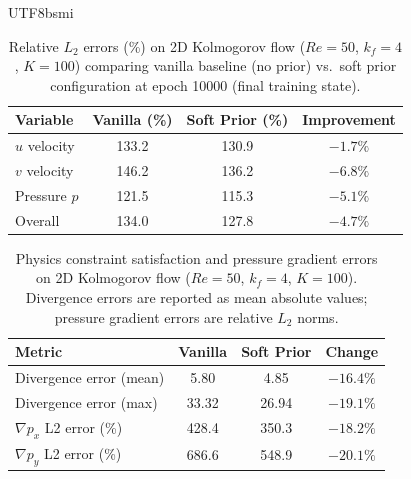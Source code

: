 \documentclass[master]{NTHUthesis}
\begin{document}
\begin{CJK*}{UTF8}{bsmi}
\begin{table}[htbp]
    \centering
    \caption{Relative $L_2$ errors (\%) on 2D Kolmogorov flow ($Re=50$, $k_f=4$, $K=100$) comparing vanilla baseline (no prior) vs.\ soft prior configuration at epoch 10000 (final training state).}
    \label{tab:kolmogorov_l2}
    \begin{tabular}{lccc}
    \toprule
    \textbf{Variable} & \textbf{Vanilla (\%)} & \textbf{Soft Prior (\%)} & \textbf{Improvement} \\
    \midrule
    $u$ velocity & 133.2 & 130.9 & $-1.7\%$ \\
    $v$ velocity & 146.2 & 136.2 & $-6.8\%$ \\
    Pressure $p$ & 121.5 & 115.3 & $-5.1\%$ \\
    \midrule
    Overall & 134.0 & 127.8 & $-4.7\%$ \\
    \bottomrule
    \end{tabular}
\end{table}

\begin{table}[htbp]
    \centering
    \caption{Physics constraint satisfaction and pressure gradient errors on 2D Kolmogorov flow ($Re=50$, $k_f=4$, $K=100$). Divergence errors are reported as mean absolute values; pressure gradient errors are relative $L_2$ norms.}
    \label{tab:kolmogorov_physics}
    \begin{tabular}{lccc}
    \toprule
    \textbf{Metric} & \textbf{Vanilla} & \textbf{Soft Prior} & \textbf{Change} \\
    \midrule
    Divergence error (mean) & 5.80 & 4.85 & $-16.4\%$ \\
    Divergence error (max) & 33.32 & 26.94 & $-19.1\%$ \\
    $\nabla p_x$ L2 error (\%) & 428.4 & 350.3 & $-18.2\%$ \\
    $\nabla p_y$ L2 error (\%) & 686.6 & 548.9 & $-20.1\%$ \\
    \bottomrule
    \end{tabular}
\end{table}


\end{CJK*}
\end{document}
